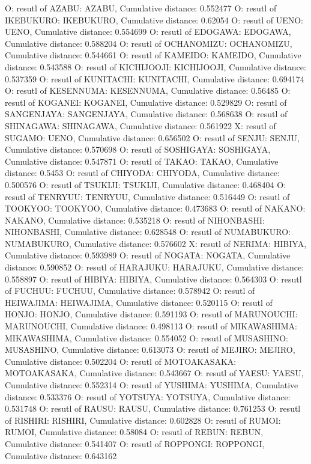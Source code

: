 O: resutl of AZABU: AZABU, Cumulative distance: 0.552477
O: resutl of IKEBUKURO: IKEBUKURO, Cumulative distance: 0.62054
O: resutl of UENO: UENO, Cumulative distance: 0.554699
O: resutl of EDOGAWA: EDOGAWA, Cumulative distance: 0.588204
O: resutl of OCHANOMIZU: OCHANOMIZU, Cumulative distance: 0.544661
O: resutl of KAMEIDO: KAMEIDO, Cumulative distance: 0.543588
O: resutl of KICHIJOOJI: KICHIJOOJI, Cumulative distance: 0.537359
O: resutl of KUNITACHI: KUNITACHI, Cumulative distance: 0.694174
O: resutl of KESENNUMA: KESENNUMA, Cumulative distance: 0.56485
O: resutl of KOGANEI: KOGANEI, Cumulative distance: 0.529829
O: resutl of SANGENJAYA: SANGENJAYA, Cumulative distance: 0.568638
O: resutl of SHINAGAWA: SHINAGAWA, Cumulative distance: 0.561922
X: resutl of SUGAMO: UENO, Cumulative distance: 0.656502
O: resutl of SENJU: SENJU, Cumulative distance: 0.570698
O: resutl of SOSHIGAYA: SOSHIGAYA, Cumulative distance: 0.547871
O: resutl of TAKAO: TAKAO, Cumulative distance: 0.5453
O: resutl of CHIYODA: CHIYODA, Cumulative distance: 0.500576
O: resutl of TSUKIJI: TSUKIJI, Cumulative distance: 0.468404
O: resutl of TENRYUU: TENRYUU, Cumulative distance: 0.516449
O: resutl of TOOKYOO: TOOKYOO, Cumulative distance: 0.473683
O: resutl of NAKANO: NAKANO, Cumulative distance: 0.535218
O: resutl of NIHONBASHI: NIHONBASHI, Cumulative distance: 0.628548
O: resutl of NUMABUKURO: NUMABUKURO, Cumulative distance: 0.576602
X: resutl of NERIMA: HIBIYA, Cumulative distance: 0.593989
O: resutl of NOGATA: NOGATA, Cumulative distance: 0.590852
O: resutl of HARAJUKU: HARAJUKU, Cumulative distance: 0.558897
O: resutl of HIBIYA: HIBIYA, Cumulative distance: 0.564303
O: resutl of FUCHUU: FUCHUU, Cumulative distance: 0.578942
O: resutl of HEIWAJIMA: HEIWAJIMA, Cumulative distance: 0.520115
O: resutl of HONJO: HONJO, Cumulative distance: 0.591193
O: resutl of MARUNOUCHI: MARUNOUCHI, Cumulative distance: 0.498113
O: resutl of MIKAWASHIMA: MIKAWASHIMA, Cumulative distance: 0.554052
O: resutl of MUSASHINO: MUSASHINO, Cumulative distance: 0.613073
O: resutl of MEJIRO: MEJIRO, Cumulative distance: 0.502204
O: resutl of MOTOAKASAKA: MOTOAKASAKA, Cumulative distance: 0.543667
O: resutl of YAESU: YAESU, Cumulative distance: 0.552314
O: resutl of YUSHIMA: YUSHIMA, Cumulative distance: 0.533376
O: resutl of YOTSUYA: YOTSUYA, Cumulative distance: 0.531748
O: resutl of RAUSU: RAUSU, Cumulative distance: 0.761253
O: resutl of RISHIRI: RISHIRI, Cumulative distance: 0.602828
O: resutl of RUMOI: RUMOI, Cumulative distance: 0.58084
O: resutl of REBUN: REBUN, Cumulative distance: 0.541407
O: resutl of ROPPONGI: ROPPONGI, Cumulative distance: 0.643162
